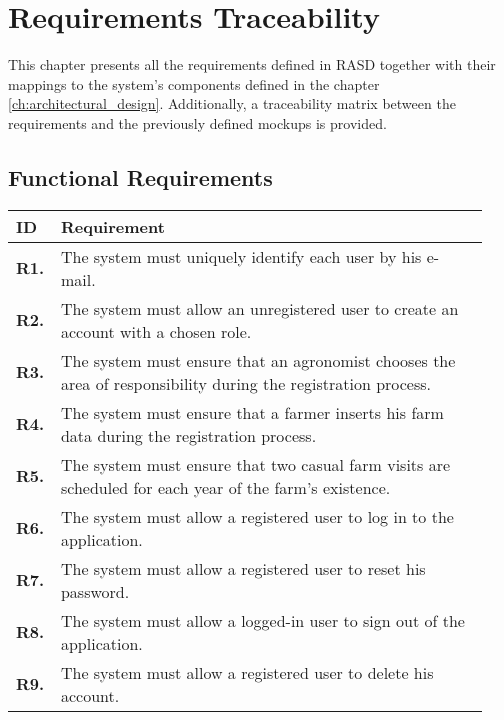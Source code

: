 \chapter{Requirements Traceability} \label{ch:requirements_traceability}

This chapter presents all the requirements defined in RASD together with their mappings to the system's components defined in the chapter \ref{ch:architectural_design}. Additionally, a traceability matrix between the requirements and the previously defined mockups is provided.

\section{Functional Requirements}

\begin{longtable}{@{}p{0.06\linewidth} p{0.88\linewidth}}
	\toprule
	\textbf{ID}   & \textbf{Requirement}\\
	\midrule
	
	\textbf{R1.} & The system must uniquely identify each user by his e-mail. \\
	\textbf{R2.} & The system must allow an unregistered user to create an account with a chosen role. \\
	\textbf{R3.} & The system must ensure that an agronomist chooses the area of responsibility during the registration process. \\
	\textbf{R4.} & The system must ensure that a farmer inserts his farm data during the registration process.\\
	\textbf{R5.} & The system must ensure that two casual farm visits are scheduled for each year of the farm's existence.\\
	\textbf{R6.} & The system must allow a registered user to log in to the application. \\
	\textbf{R7.} & The system must allow a registered user to reset his password. \\
	\textbf{R8.} & The system must allow a logged-in user to sign out of the application. \\
	\textbf{R9.} & The system must allow a registered user to delete his account. \\
	

\end{longtable}
